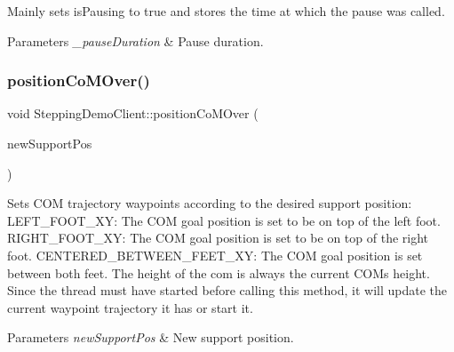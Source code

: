 Mainly sets is\+Pausing to true and stores the time at which the pause was called.


\begin{DoxyParams}{Parameters}
{\em \+\_\+pause\+Duration} & Pause duration. \\
\hline
\end{DoxyParams}
\hypertarget{classSteppingDemoClient_a18609e5634a283423c228106bb0e3a45}{}\label{classSteppingDemoClient_a18609e5634a283423c228106bb0e3a45} 
\subsubsection{\texorpdfstring{position\+Co\+M\+Over()}{positionCoMOver()}}
{\footnotesize\ttfamily void Stepping\+Demo\+Client\+::position\+Co\+M\+Over (\begin{DoxyParamCaption}\item[{\hyperlink{SteppingDemoClient_8h_ac0c3848a609566394821d9826e0fdd5b}{C\+O\+M\+\_\+\+S\+U\+P\+P\+O\+R\+T\+\_\+\+P\+O\+S\+I\+T\+I\+ON}}]{new\+Support\+Pos }\end{DoxyParamCaption})\hspace{0.3cm}{\ttfamily [private]}}

Sets C\+OM trajectory waypoints according to the desired support position\+: L\+E\+F\+T\+\_\+\+F\+O\+O\+T\+\_\+\+XY\+: The C\+OM goal position is set to be on top of the left foot. R\+I\+G\+H\+T\+\_\+\+F\+O\+O\+T\+\_\+\+XY\+: The C\+OM goal position is set to be on top of the right foot. C\+E\+N\+T\+E\+R\+E\+D\+\_\+\+B\+E\+T\+W\+E\+E\+N\+\_\+\+F\+E\+E\+T\+\_\+\+XY\+: The C\+OM goal position is set between both feet. The height of the com is always the current C\+OM\textquotesingle{}s height. Since the thread must have started before calling this method, it will update the current waypoint trajectory it has or start it.


\begin{DoxyParams}{Parameters}
{\em new\+Support\+Pos} & New support position. \\
\hline
\end{DoxyParams}
\hypertarget{classSteppingDemoClient_aafcb227c0d7ce24823957e2331caa88b}{}\label{classSteppingDemoClient_aafcb227c0d7ce24823957e2331caa88b} 
